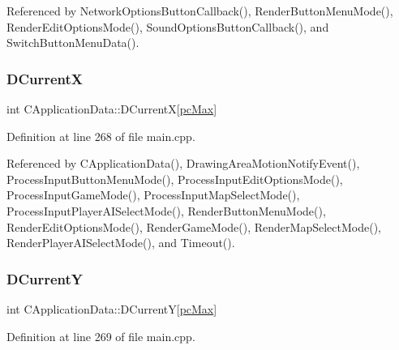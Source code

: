 Referenced by Network\+Options\+Button\+Callback(), Render\+Button\+Menu\+Mode(), Render\+Edit\+Options\+Mode(), Sound\+Options\+Button\+Callback(), and Switch\+Button\+Menu\+Data().

\hypertarget{classCApplicationData_a1dc7ee482a39f7978c71365ac540f97a}{}\label{classCApplicationData_a1dc7ee482a39f7978c71365ac540f97a} 
\subsubsection{\texorpdfstring{D\+CurrentX}{DCurrentX}}
{\footnotesize\ttfamily int C\+Application\+Data\+::\+D\+CurrentX\mbox{[}\hyperlink{GameDataTypes_8h_aafb0ca75933357ff28a6d7efbdd7602fa594a5c8dd3987f24e8a0f23f1a72cd34}{pc\+Max}\mbox{]}\hspace{0.3cm}{\ttfamily [protected]}}



Definition at line 268 of file main.\+cpp.



Referenced by C\+Application\+Data(), Drawing\+Area\+Motion\+Notify\+Event(), Process\+Input\+Button\+Menu\+Mode(), Process\+Input\+Edit\+Options\+Mode(), Process\+Input\+Game\+Mode(), Process\+Input\+Map\+Select\+Mode(), Process\+Input\+Player\+A\+I\+Select\+Mode(), Render\+Button\+Menu\+Mode(), Render\+Edit\+Options\+Mode(), Render\+Game\+Mode(), Render\+Map\+Select\+Mode(), Render\+Player\+A\+I\+Select\+Mode(), and Timeout().

\hypertarget{classCApplicationData_a0ba39779ae11c8072258c6ddfebd6052}{}\label{classCApplicationData_a0ba39779ae11c8072258c6ddfebd6052} 
\subsubsection{\texorpdfstring{D\+CurrentY}{DCurrentY}}
{\footnotesize\ttfamily int C\+Application\+Data\+::\+D\+CurrentY\mbox{[}\hyperlink{GameDataTypes_8h_aafb0ca75933357ff28a6d7efbdd7602fa594a5c8dd3987f24e8a0f23f1a72cd34}{pc\+Max}\mbox{]}\hspace{0.3cm}{\ttfamily [protected]}}



Definition at line 269 of file main.\+cpp.



